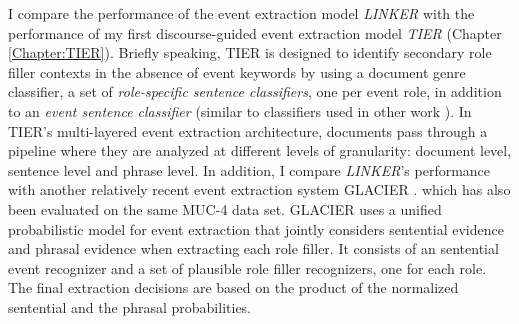I compare the performance of the event extraction model {\it LINKER} with 
the performance of my first discourse-guided event extraction 
model {\it TIER} (Chapter \ref{Chapter:TIER}). 
Briefly speaking, 
TIER is designed to identify secondary role
filler contexts in the absence of event keywords by using a document genre classifier,  a set of
{\it role-specific sentence classifiers}, one per event role, in
addition to an {\it event sentence classifier} (similar to classifiers
used in other work \cite{patwardhan-emnlp09,gu06}).  
In TIER's multi-layered event extraction architecture, 
documents pass through a pipeline where they are
analyzed at different levels of granularity: document level, sentence
level and phrase level. 
In addition, I compare {\it LINKER}'s performance with another 
relatively recent event extraction system GLACIER \cite{patwardhan-emnlp09}. 
which has also been evaluated on 
the same MUC-4 data set.  
GLACIER uses a unified probabilistic model for event extraction that jointly
considers sentential evidence and phrasal evidence when extracting
each role filler.  It consists of an sentential event recognizer and a set of
plausible role filler recognizers, one for each role. 
The final extraction
decisions are based on the product of the normalized sentential and
the phrasal probabilities.

